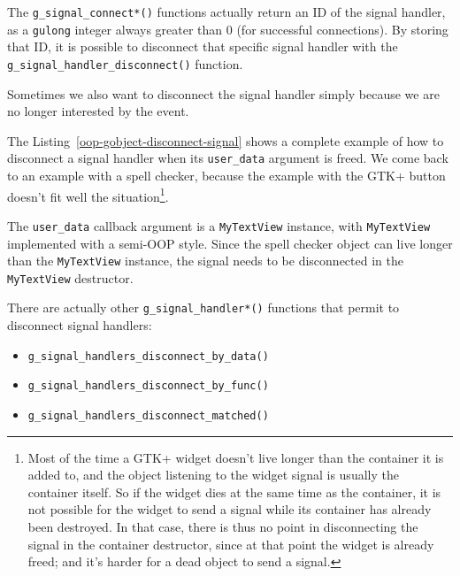 The \lstinline{g_signal_connect*()} functions actually return an ID of the signal handler, as a \lstinline{gulong} integer always greater than 0 (for successful connections). By storing that ID, it is possible to disconnect that specific signal handler with the \lstinline{g_signal_handler_disconnect()} function.

Sometimes we also want to disconnect the signal handler simply because we are no longer interested by the event.

The Listing~\ref{oop-gobject-disconnect-signal} shows a complete example of how to disconnect a signal handler when its \lstinline{user_data} argument is freed. We come back to an example with a spell checker, because the example with the GTK+ button doesn't fit well the situation\footnote{Most of the time a GTK+ widget doesn't live longer than the container it is added to, and the object listening to the widget signal is usually the container itself. So if the widget dies at the same time as the container, it is not possible for the widget to send a signal while its container has already been destroyed. In that case, there is thus no point in disconnecting the signal in the container destructor, since at that point the widget is already freed; and it's harder for a dead object to send a signal\footnotemark.}.

The \lstinline{user_data} callback argument is a \lstinline{MyTextView} instance, with \lstinline{MyTextView} implemented with a semi-OOP style. Since the spell checker object can live longer than the \lstinline{MyTextView} instance, the signal needs to be disconnected in the \lstinline{MyTextView} destructor.

\vspace{0.7cm}


There are actually other \lstinline{g_signal_handler*()} functions that permit to disconnect signal handlers:
\begin{itemize}
  \item \lstinline{g_signal_handlers_disconnect_by_data()}
  \item \lstinline{g_signal_handlers_disconnect_by_func()}
  \item \lstinline{g_signal_handlers_disconnect_matched()}
\end{itemize}

